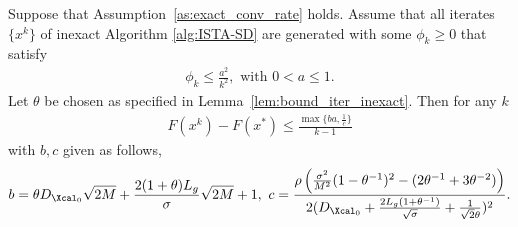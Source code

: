 \documentclass[11pt]{article}
\numberwithin{equation}{section}
\begin{document}
\begin{theorem}\label{th:inexact_conv_rate}
Suppose that Assumption~\ref{as:exact_conv_rate} holds. 
Assume that all iterates $\{x^k\}$ of inexact Algorithm \ref{alg:ISTA-SD} are generated with some $\phi_k\geq 0$ that satisfy
\begin{align}
\label{equ:phi_conv_rate_required}
    \phi_k \leq \frac{a^2}{k^2}, \mbox{ with } 0<a \leq 1. 
\end{align}
Let  $\theta$ be chosen as specified in Lemma~\ref{lem:bound_iter_inexact}. Then for any $k$
\begin{align}
    \label{eq:bound_F_F*}
	F(x^k) - F(x^*) 
    \leq \frac{\max\{ba, \frac{1}{c}\}}{k-1}
\end{align}
with $b, c$  given as follows,
\begin{align}
\label{equ:bound_b_c}
    b = \theta D_{\Xcal_0}\sqrt{2M}+  \frac{2(1+\theta)L_g}{\sigma}\sqrt{2M} + 1, 
    ~
    c = \frac{\rho \left( \frac{\sigma^2}{M^2}(1 - \theta^{-1})^2 - (2\theta^{-1} + 3\theta^{-2}) \right)}{2(D_{\Xcal_0} +
     \frac{2L_g(1+\theta^{-1})}{\sqrt{\sigma}} + \frac{1}{\sqrt{2}\theta})^2}.
\end{align}
\end{theorem}
\end{document}
